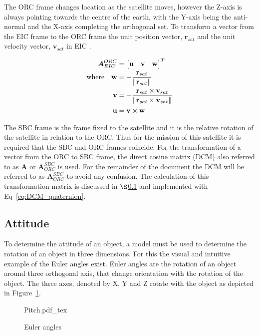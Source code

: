 The ORC frame changes location as the satellite moves, however the Z-axis is always pointing towards the centre of the earth, with the Y-axis being the anti-normal and the X-axis completing the orthogonal set. To transform a vector from the EIC frame to the ORC frame the unit position vector, $\mathbf{r}_{sat}$ and the unit velocity vector, $\mathbf{v}_{sat}$ in EIC \cite{Chen_ground-target}.

\begin{equation}
\label{Eq: ORC to EIC}
\begin{aligned}
	\boldsymbol{A}^{ORC}_{EIC} &= 
	\begin{bmatrix}
		\mathbf{u} & \mathbf{v} & \mathbf{w}\\
	\end{bmatrix}^T \\
\text{where} \quad
\mathbf{w} &= -\frac{\mathbf{r}_{sat}}{\left\lVert\mathbf{r}_{sat}\right\rVert} \\
\mathbf{v} &= -\frac{\mathbf{r}_{sat} \times \mathbf{v}_{sat}}{\left\lVert\mathbf{r}_{sat} \times \mathbf{v}_{sat}\right\rVert} \\
\mathbf{u} &= \mathbf{v} \times \mathbf{w} \\
\end{aligned}
\end{equation}

The SBC frame is the frame fixed to the satellite and it is the relative rotation of the satellite in relation to the ORC. Thus for the mission of this satellite it is required that the SBC and ORC frames coincide. For the transformation of a vector from the ORC to SBC frame, the direct cosine matrix (DCM) also referred to as $\boldsymbol{A}$ or $\boldsymbol{A}^{SBC}_{ORC}$ is used. For the remainder of the document the DCM will be referred to as $\boldsymbol{A}^{SBC}_{ORC}$ to avoid any confusion. The calculation of this transformation matrix is discussed in $\S$\ref{subsection_quaternions} and implemented with Eq~\ref{eq:DCM_quaternion}.


\subsection{Attitude}
\label{subsection_quaternions}
To determine the attitude of an object, a model must be used to determine the rotation of an object in three dimensions. For this the visual and intuitive example of the Euler angles exist. Euler angles are the rotation of an object around three orthogonal axis, that change orientation with the rotation of the object. The three axes, denoted by X, Y and Z rotate with the object as depicted in Figure~\ref{fig:Pitch}.
\begin{figure}[!htb]
	\centering
	\def\svgwidth{10cm}
	{Pitch.pdf_tex}
	\label{fig:Pitch}
	\caption{Euler angles}
\end{figure}

